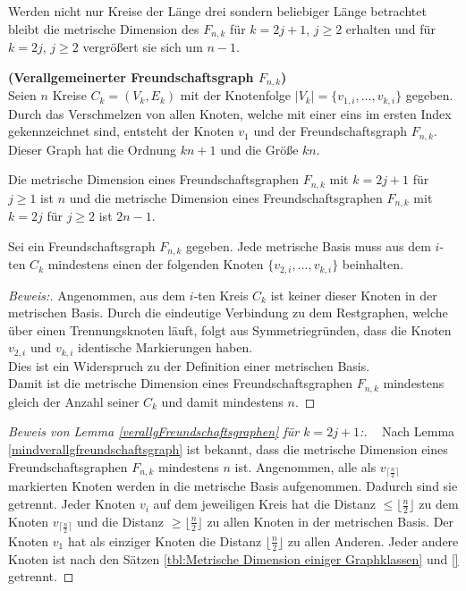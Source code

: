 Werden nicht nur Kreise der Länge drei sondern beliebiger Länge betrachtet bleibt die metrische Dimension des $F_{n,k}$ für $k=2j+1$, $j\geq 2$ erhalten und für $k=2j$, $j\geq 2$ vergrößert sie sich um $n-1$.
\begin{defi}{\textbf{(Verallgemeinerter Freundschaftsgraph $F_{n,k}$)}}\\
Seien $n$ Kreise $C_k=(V_k,E_k)$ mit der Knotenfolge $|V_k|=\{v_{1,i},\ldots,v_{k,i}\}$ gegeben. Durch das Verschmelzen von allen Knoten, welche mit einer eins im ersten Index gekennzeichnet sind, entsteht der Knoten $v_1$ und der Freundschaftsgraph $F_{n,k}$. Dieser Graph hat die Ordnung $kn+1$ und die Größe $kn$.
\end{defi}

\begin{lem}
\label{verallgFreundschaftsgraphen}
Die metrische Dimension eines Freundschaftsgraphen $F_{n,k}$ mit $k=2j+1$ für $j \geq 1$ ist $n$ und die metrische Dimension eines Freundschaftsgraphen $F_{n,k}$ mit $k=2j$ für $j \geq 2$ ist $2n-1$.
\end{lem}
\begin{lem}
\label{mindverallgfreundschaftsgraph}
Sei ein Freundschaftsgraph $F_{n,k}$ gegeben. Jede metrische Basis muss aus dem $i$-ten $C_k$ mindestens einen der folgenden Knoten $\{v_{2,i},\ldots,v_{k,i}\}$ beinhalten.
\end{lem}
\begin{proof}[Beweis:]
Angenommen, aus dem $i$-ten Kreis $C_k$ ist keiner dieser Knoten in der metrischen Basis. Durch die eindeutige Verbindung zu dem Restgraphen, welche über einen Trennungsknoten läuft, folgt aus Symmetriegründen, dass die Knoten $v_{2,i}$ und $v_{k,i}$ identische Markierungen haben.\\Dies ist ein Widerspruch zu der Definition einer metrischen Basis.\\
Damit ist die metrische Dimension eines Freundschaftsgraphen $F_{n,k}$ mindestens gleich der Anzahl seiner $C_{k}$ und damit mindestens $n$.
\end{proof}
\vspace{-6mm}
\begin{proof}[Beweis von Lemma \ref{verallgFreundschaftsgraphen} für $k=2j+1$:] \vspace{+1mm} ~ \linebreak 
Nach Lemma \ref{mindverallgfreundschaftsgraph} ist bekannt, dass die metrische Dimension eines Freundschaftsgraphen $F_{n,k}$ mindestens $n$ ist. Angenommen, alle als $v_{\lceil \frac{n}{2} \rceil}$ markierten Knoten werden in die metrische Basis aufgenommen. Dadurch sind sie getrennt. Jeder Knoten $v_i$ auf dem jeweiligen Kreis hat die Distanz $\leq \lfloor \frac{n}{2} \rfloor$ zu dem Knoten $v_{\lceil \frac{n}{2} \rceil}$ und die Distanz $\geq \lfloor \frac{n}{2} \rfloor$ zu allen Knoten in der metrischen Basis. Der Knoten $v_1$ hat als einziger Knoten die Distanz $\lfloor \frac{n}{2} \rfloor$ zu allen Anderen. Jeder andere Knoten ist nach den Sätzen \ref{tbl:Metrische Dimension einiger Graphklassen} und \ref{} getrennt.
\end{proof}
